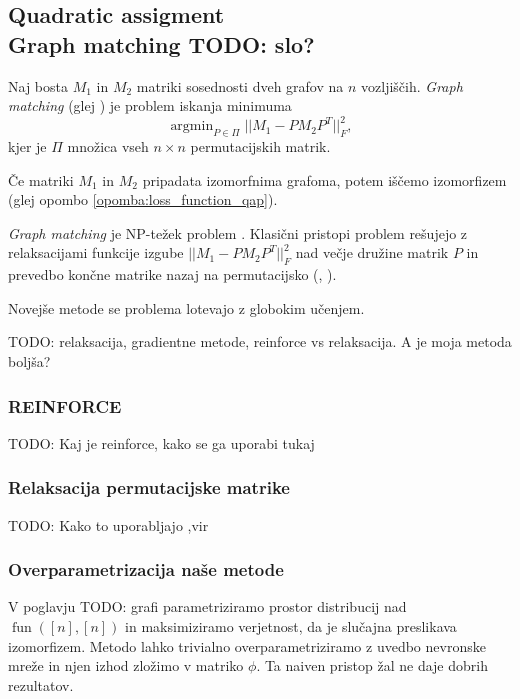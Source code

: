 \documentclass[mat2, tisk]{fmfdelo}
\newcommand{\TODO}[1]{{\color{blue} TODO: #1}}
\newcommand{\fun}{\operatorname{fun}}
\newcommand{\funnn}[1]{\fun([#1], [#1])}
\begin{document}
            \subsection{Quadratic assigment \\ Graph matching \TODO{slo?}}
            \label{section:graph_matching}
            \begin{definicija}
              Naj bosta $M_1$ in $M_2$ matriki sosednosti dveh grafov
              na $n$ vozljiščih. \emph{Graph matching} (glej
              \cite{lyzinski2015graphmatchingrelaxrisk}) je problem
              iskanja minimuma
              $$
              \operatorname{argmin}_{P \in \Pi} ||M_1 - PM_2P^T ||_F^2,
              $$
              kjer je $\Pi$ množica vseh $n \times n$ permutacijskih  matrik.

              Če matriki $M_1$ in $M_2$ pripadata izomorfnima
              grafoma, potem iščemo izomorfizem (glej opombo
              \ref{opomba:loss_function_qap}).
            \end{definicija}

            \emph{Graph matching} je NP-težek problem
            \cite{sahni1976qapisnphard}. Klasični pristopi problem
            rešujejo z relaksacijami funkcije izgube $||M_1 - P M_2
            P^T||_F^2$ nad večje družine matrik $P$ in prevedbo
            končne matrike nazaj na permutacijsko
            (\cite{lyzinski2015graphmatchingrelaxrisk},
            \cite{aflalo2025convexrelaxation}).

            Novejše metode se problema lotevajo z globokim učenjem.

            \TODO{relaksacija, gradientne metode, reinforce vs
            relaksacija. A je moja metoda boljša?}

            \subsubsection{REINFORCE}
            \TODO{Kaj je reinforce, kako se ga uporabi tukaj}
            \subsubsection{Relaksacija permutacijske matrike}
            \TODO{Kako to uporabljajo ,vir}
            \subsubsection{Overparametrizacija naše metode}
            V poglavju \TODO{grafi} parametriziramo prostor
            distribucij nad $\funnn{n}$ in maksimiziramo verjetnost,
            da je slučajna preslikava izomorfizem.
            Metodo lahko trivialno overparametriziramo z uvedbo
            nevronske mreže in njen izhod zložimo v matriko $\phi$.
            Ta naiven pristop žal ne daje dobrih rezultatov.
\end{document}
